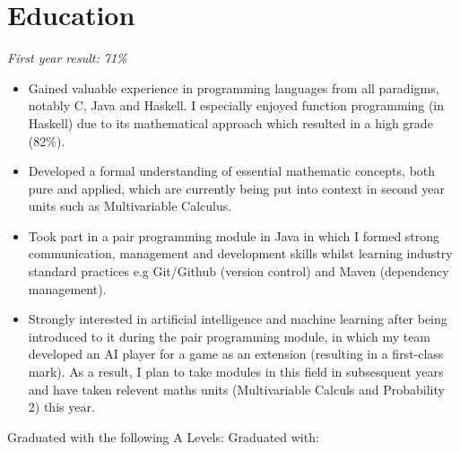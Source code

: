 \documentclass{cvclass}
\begin{document}
\titlespacing*{\subsection}{0pt}{\baselineskip}{1pt}
\address{Flat 7, 5-6 Clifton Down Road, Bristol, BS8 4AG}
\address{Email: sv17490@bristol.ac.uk, Mobile: 07908911995}
\address{Github: www.github.com/sollyvarcoe}
\section{Education}
\newline
\indent\indent\textit{First year result: 71\%}
\begin{itemize}
  \item Gained valuable experience in programming languages from all paradigms, notably C, Java and Haskell. I especially enjoyed function programming (in Haskell) due to its mathematical approach which resulted in a high grade (82\%).
  \item Developed a formal understanding of essential mathematic concepts, both pure and applied, which are currently being put into context in second year units such as Multivariable Calculus.
  \item Took part in a pair programming module in Java in which I formed strong communication, management and development skills whilst learning industry standard practices e.g Git/Github (version control) and Maven (dependency management).
  \item Strongly interested in artificial intelligence and machine learning after being introduced to it during the pair programming module, in which my team developed an AI player for a game as an extension (resulting in a first-class mark). As a result, I plan to take modules in this field in subsesquent years and have taken relevent maths units (Multivariable Calculs and Probability 2) this year.
\end{itemize}
\newline
{}\newline
{}


\newline
{}\newline
{}
Graduated with the following A Levels: \newline
\hangindent=1cm
Graduated with:\newline
\hangindent=1cm
\end{document}
